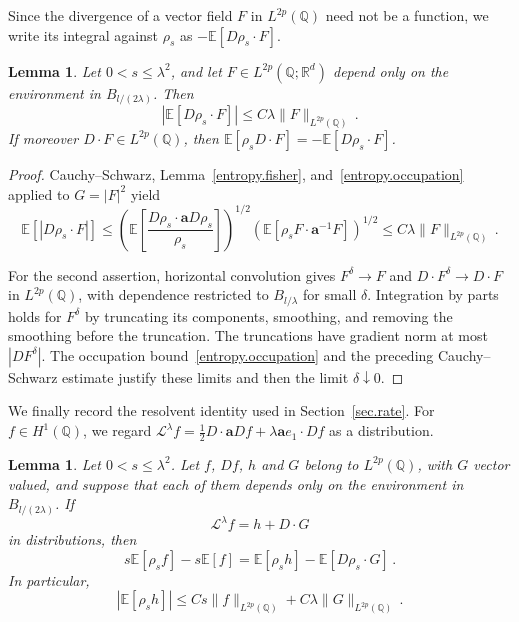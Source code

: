 \documentclass[11pt]{amsart}
\newtheorem{lemma}[proposition]{Lemma}
\theoremstyle{definition}
\theoremstyle{remark}
\numberwithin{equation}{section}
\newcommand{\E}{\mathbb E}
\newcommand{\Q}{\mathbb Q}
\newcommand{\R}{\mathbb R}
\renewcommand{\a}{\mathbf a}
\begin{document}
Since the divergence of a vector field $F$ in $L^{2p}(\Q)$ need not be a function, we write its integral against $\rho_s$ as $-\E[D\rho_s\cdot F]$.

\begin{lemma}\label{entropy.divergence}
Let $0<s\leq\lambda^2$, and let $F\in L^{2p}(\Q;\R^d)$ depend only on the environment in $B_{l/(2\lambda)}$. Then
\begin{equation}\label{entropy.divergence.bound}
 |\E[D\rho_s\cdot F]|
 \leq C\lambda\|F\|_{L^{2p}(\Q)}\, .
\end{equation}
If moreover $D\cdot F\in L^{2p}(\Q)$, then $\E[\rho_sD\cdot F]=-\E[D\rho_s\cdot F]$.
\end{lemma}

\begin{proof}
Cauchy--Schwarz, Lemma~\ref{entropy.fisher}, and~\eqref{entropy.occupation} applied to $G=|F|^2$ yield
\begin{equation*}
 \E[|D\rho_s\cdot F|]
 \leq\left(\E\left[\frac{D\rho_s\cdot\a D\rho_s}{\rho_s}\right]
 \right)^{1/2}
 \left(\E[\rho_sF\cdot\a^{-1}F]\right)^{1/2}
 \leq C\lambda\|F\|_{L^{2p}(\Q)}\, .
\end{equation*}

For the second assertion, horizontal convolution gives $F^\delta\to F$ and $D\cdot F^\delta\to D\cdot F$ in $L^{2p}(\Q)$, with dependence restricted to $B_{l/\lambda}$ for small $\delta$. Integration by parts holds for $F^\delta$ by truncating its components, smoothing, and removing the smoothing before the truncation. The truncations have gradient norm at most $|DF^\delta|$. The occupation bound~\eqref{entropy.occupation} and the preceding Cauchy--Schwarz estimate justify these limits and then the limit $\delta\downarrow0$.
\end{proof}

We finally record the resolvent identity used in Section~\ref{sec.rate}. For $f\in H^1(\Q)$, we regard $\mathcal L^\lambda f=\frac12D\cdot\a Df+\lambda\a e_1\cdot Df$ as a distribution.

\begin{lemma}\label{entropy.resolvent}
Let $0<s\leq\lambda^2$. Let $f$, $Df$, $h$ and $G$ belong to $L^{2p}(\Q)$, with $G$ vector valued, and suppose that each of them depends only on the environment in $B_{l/(2\lambda)}$. If
\begin{equation*}
 \mathcal L^\lambda f=h+D\cdot G
\end{equation*}
in distributions, then
\begin{equation}\label{entropy.resolvent.identity}
 s\E[\rho_sf]-s\E[f]
 =\E[\rho_sh]-\E[D\rho_s\cdot G]\, .
\end{equation}
In particular,
\begin{equation}\label{entropy.resolvent.bound}
 |\E[\rho_sh]|
 \leq Cs\|f\|_{L^{2p}(\Q)}+C\lambda\|G\|_{L^{2p}(\Q)}\, .
\end{equation}
\end{lemma}
\end{document}
